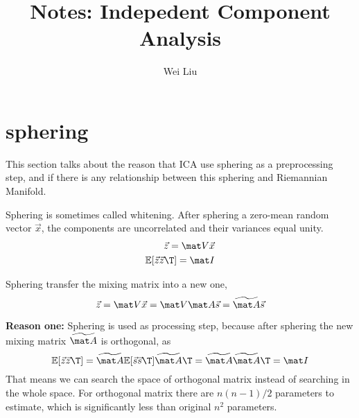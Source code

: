 \documentclass[12pt]{article}
\begin{document}
\title{Notes: Indepedent Component Analysis}
\author{Wei Liu}
\maketitle
\section{sphering}
This section talks about the reason that ICA use sphering as a
preprocessing step, and if there is any relationship between this
sphering and Riemannian Manifold.

Sphering is sometimes called whitening. After sphering a zero-mean random vector $\vec x$, the components are uncorrelated and their variances equal unity.
\begin{align}
\vec z = \mat V \vec x \\
\mathbb{E}[\vec z \vec z\T] = \mat I
\end{align}

Sphering transfer the mixing matrix into a new one,
\begin{equation*}
  \vec z = \mat V \vec x = \mat V \mat A \vec s = \widetilde {\mat A} \vec s
\end{equation*}


\textbf{Reason one: } Sphering is used as processing step, because after sphering the new mixing matrix $\widetilde{\mat A}$ is orthogonal, as 
\begin{equation*}
  \mathbb{E}[\vec z \vec z\T] = \widetilde{\mat A} \mathbb{E}[\vec s \vec s\T]\widetilde{\mat A}\T = \widetilde{\mat A}\widetilde{\mat A}\T = \mat I
\end{equation*}
That means we can search the space of orthogonal matrix instead of searching in the whole space. For orthogonal matrix there are $n(n-1)/2$ parameters to estimate, which is significantly less than original $n^2$ parameters.



\end{document}
